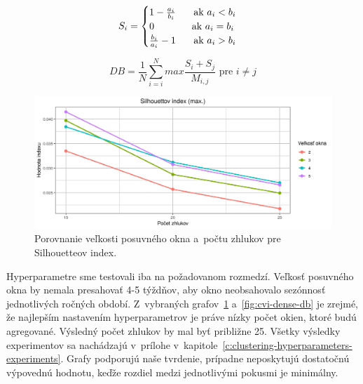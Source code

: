 \documentclass[a4paper,twoside,slovak,12pt,appendix]{article}
\begin{document}
\begin{equation}
  \label{eq:silhouette-index}
  S_i =
  \begin{cases}
    1 - \frac{a_i}{b_i} \indent \text{ ak } a_i < b_i \\
    0                   \indent \indent \hphantom{a} \text{ ak } a_i = b_i \\
    \frac{b_i}{a_i} - 1 \indent \text{ ak } a_i > b_i \\
  \end{cases}
\end{equation}

\begin{equation}
  \label{eq:davies-bouldin-index}
  DB = \frac{1}{N} \sum^N_{i = i} max \frac{S_i + S_j}{M_{i, j}} \text{ pre } i \neq j
\end{equation}

\begin{figure}[htbp]
  \centering
  \includegraphics[width=\textwidth]{cvi/dtw_basic_workdays_sparse/201904291110-Sil-dtw_basic_workdays_sparse.png}
  \caption{Porovnanie veľkosti posuvného okna a~počtu zhlukov pre Silhouetteov index.}
	\label{fig:cvi-sparse-sil}
\end{figure}

\noindent
Hyperparametre sme testovali iba na požadovanom rozmedzí. Veľkosť posuvného okna
by nemala presahovať 4-5 týždňov, aby okno neobsahovalo sezónnosť jednotlivých
ročných období. Z~vybraných grafov~\ref{fig:cvi-sparse-sil}
a~\ref{fig:cvi-dense-db} je zrejmé, že najlepším nastavením hyperparametrov je
práve nízky počet okien, ktoré budú agregované. Výsledný počet zhlukov by mal
byť približne 25. Všetky výsledky experimentov sa nachádzajú v~prílohe
v~kapitole~\ref{c:clustering-hyperparameters-experiments}. Grafy podporujú naše
tvrdenie, prípadne neposkytujú dostatočnú výpovednú hodnotu, keďže rozdiel medzi
jednotlivými pokusmi je minimálny.
\end{document}
